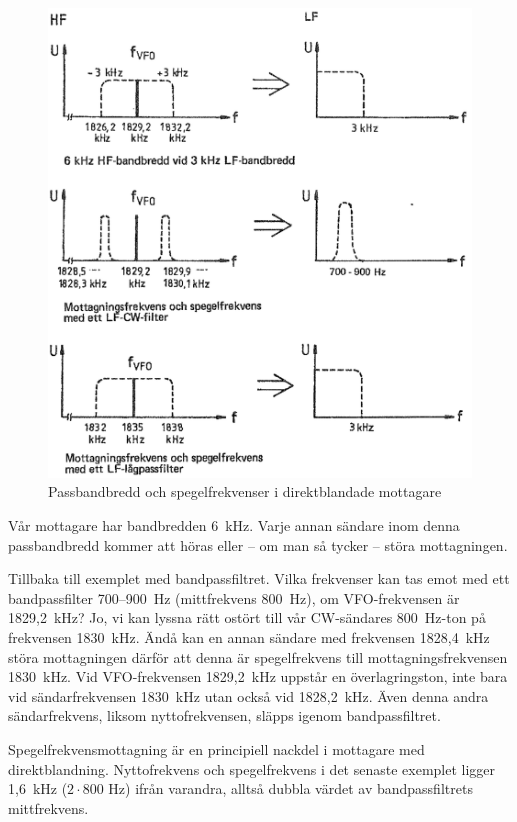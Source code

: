 \begin{figure}
  \includegraphics[width=\textwidth]{images/cropped_pdfs/bild_2_4-12.pdf}
  \caption{Passbandbredd och spegelfrekvenser i direktblandade mottagare}
  \label{fig:bildII4-12}
\end{figure}

Vår mottagare har bandbredden 6~kHz. Varje annan sändare inom denna
passbandbredd kommer att höras eller -- om man så tycker -- störa
mottagningen.

Tillbaka till exemplet med bandpassfiltret. Vilka frekvenser kan tas
emot med ett bandpassfilter 700--900~Hz (mittfrekvens 800~Hz), om
VFO-frekvensen är 1829,2~kHz? Jo, vi kan lyssna rätt ostört till vår
CW-sändares 800~Hz-ton på frekvensen 1830~kHz. Ändå kan en annan
sändare med frekvensen 1828,4~kHz störa mottagningen därför att denna
är spegelfrekvens till mottagningsfrekvensen 1830~kHz. Vid
VFO-frekvensen 1829,2~kHz uppstår en överlagringston, inte bara vid
sändarfrekvensen 1830~kHz utan också vid 1828,2~kHz. Även denna andra
sändarfrekvens, liksom nyttofrekvensen, släpps igenom bandpassfiltret.

Spegelfrekvensmottagning är en principiell nackdel i mottagare med
direktblandning. Nyttofrekvens och spegelfrekvens i det senaste
exemplet ligger 1,6~kHz (\(2 \cdot 800\) Hz) ifrån varandra, alltså
dubbla värdet av bandpassfiltrets mittfrekvens.

